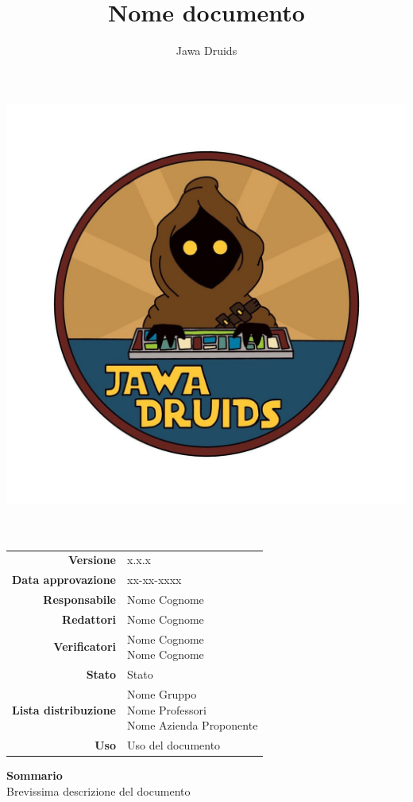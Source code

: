 




\makeatletter
\begin{titlepage}
	\begin{center}
		\vspace*{-4,0cm}
		\author{Jawa Druids} 
		\title{Nome documento}
		\date{} %
		\includegraphics[width=0.7\linewidth]{../immagini/DRUIDSLOGO.jpg}\\[4ex]
		{\huge \bfseries  \@title }\\[2ex] 
		{\LARGE  \@author}\\[50ex]
		\vspace*{-8,0cm}
		\begin{table}[H]
			\centering
			\begin{tabular}{r | l}
				\textbf{Versione} & x.x.x \\%
				\textbf{Data approvazione} & xx-xx-xxxx\\
				\textbf{Responsabile} & Nome Cognome\\
				\textbf{Redattori} & Nome Cognome \\
				\textbf{Verificatori} & \makecell[tl]{Nome Cognome \\ Nome Cognome} \\
				\textbf{Stato} & Stato\\
				\textbf{Lista distribuzione} & \makecell[tl]{Nome Gruppo \\ Nome Professori \\ Nome Azienda Proponente}\\
				\textbf{Uso} & Uso del documento            
			\end{tabular}
		\end{table}
		\vspace{0.4cm}
		\hfill \break
		\fontsize{17}{10}\textbf{Sommario} \\
		\vspace{0.1cm}
		Brevissima descrizione del documento 
	\end{center}
\end{titlepage}
\makeatother




\tableofcontents{}



